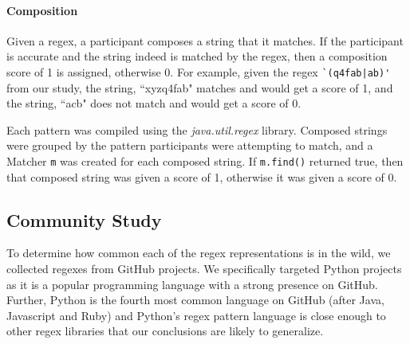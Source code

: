 \paragraph{Composition}
Given a regex, a participant composes a string that it matches. If the participant is accurate and the string indeed is matched by the regex, then a composition score of 1 is assigned, otherwise 0.  For example, given the regex \verb!`(q4fab|ab)'! from our study, the string, ``xyzq4fab" matches  and would get a score of 1, and the string, ``acb" does not match and would get a score of 0.

Each pattern was compiled using the \emph{java.util.regex} library.
Composed strings were grouped by the pattern participants were attempting to match, and a Matcher \verb!m! was created for each composed string.  If \verb!m.find()! returned true, then that composed string was given a score of 1, otherwise it was given a score of 0.

\subsection{Community Study}
\label{communitystudy}
To determine how common each of the regex representations is in the wild, we collected
regexes from GitHub projects. We specifically targeted Python projects as it is a popular programming language with a strong presence on GitHub. Further, Python is the fourth most common language on GitHub (after Java, Javascript and Ruby) and Python's regex pattern
language is close enough to other regex libraries that our conclusions are likely to generalize.



